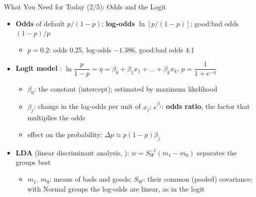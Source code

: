 \begin{frame}{What You Need for Today (2/5): Odds and the Logit}
\itemsize{\footnotesize}
\begin{itemize}
    \item \textbf{Odds} of default $p/(1 - p)$; \textbf{log-odds} $\ln[p/(1 - p)]$; good:bad odds $(1 - p)/p$
    \begin{itemize}
        \item $p = 0.2$: odds 0.25, log-odds $-1.386$, good:bad odds 4:1
    \end{itemize}
    \item \textbf{Logit model} : $\ln\dfrac{p}{1 - p} = \eta = \beta_0 + \beta_1x_1 + \dots + \beta_kx_k$, \quad $p = \dfrac{1}{1 + e^{-\eta}}$
    \begin{itemize}
        \item $\beta_0$: the constant (intercept); estimated by maximum likelihood
        \item $\beta_j$: change in the log-odds per unit of $x_j$; $e^{\beta_j}$: \textbf{odds ratio}, the factor that multiplies the odds
        \item effect on the probability: $\Delta p \approx p(1 - p)\beta_j$
    \end{itemize}
    \item \textbf{LDA} (linear discriminant analysis, ): $w = S_W^{-1}(m_1 - m_0)$ separates the groups best
    \begin{itemize}
        \item $m_1$, $m_0$: means of bads and goods; $S_W$: their common (pooled) covariance; with Normal groups the log-odds are linear, as in the logit
    \end{itemize}
\end{itemize}
\end{frame}

